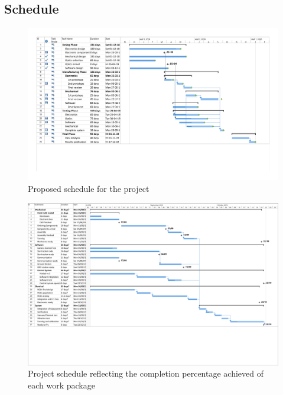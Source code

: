 \begin{landscape}

\subsection{Schedule}
\begin{figure}[H]

\includegraphics[scale=0.65]{3-project-planning/img/Gantt1_15072019.pdf}
\caption{Proposed schedule for the project}
\label{GanttChart}
\end{figure}

\begin{figure}[H]
	\centering
	\includegraphics[scale=0.5]{3-project-planning/img/Gantt_2_Comp.pdf}
	\caption{Project schedule reflecting the completion percentage achieved of each work package}
	\label{Grantt2}
\end{figure}
\end{landscape}
